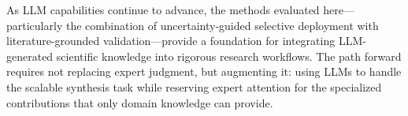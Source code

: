 As LLM capabilities continue to advance, the methods evaluated here---particularly the combination of uncertainty-guided selective deployment with literature-grounded validation---provide a foundation for integrating LLM-generated scientific knowledge into rigorous research workflows. The path forward requires not replacing expert judgment, but augmenting it: using LLMs to handle the scalable synthesis task while reserving expert attention for the specialized contributions that only domain knowledge can provide.









